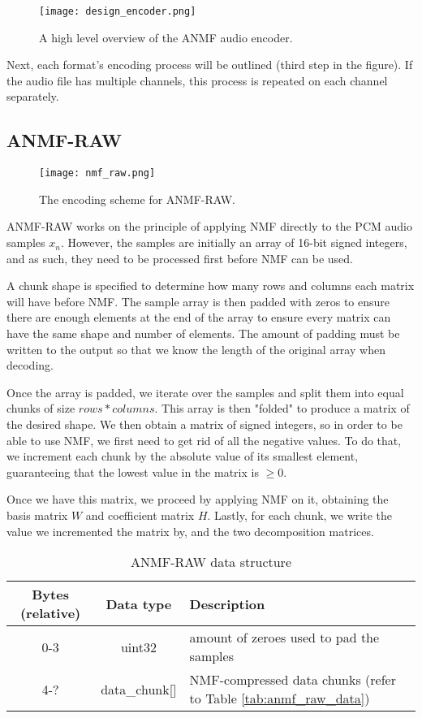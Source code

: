 \begin{figure}[ht]
	\caption[Encoder overview]{A high level overview of the ANMF audio encoder.}
	\label{fig:design_encoder}
	\centering
	\texttt{[image: design\_encoder.png]}
\end{figure}

Next, each format's encoding process will be outlined (third step in the figure). If the audio file has multiple channels, this process is repeated on each channel separately.

\subsection{ANMF-RAW}
\begin{figure}[ht]
	\caption[ANMF-RAW Encoder]{The encoding scheme for ANMF-RAW.}
	\label{fig:encoding_nmf_raw}
	\centering
	\texttt{[image: nmf\_raw.png]}
\end{figure}

ANMF-RAW works on the principle of applying NMF directly to the PCM audio samples $x_n$. However, the samples are initially an array of 16-bit signed integers, and as such, they need to be processed first before NMF can be used.

A chunk shape is specified to determine how many rows and columns each matrix will have before NMF. The sample array is then padded with zeros to ensure there are enough elements at the end of the array to ensure every matrix can have the same shape and number of elements. The amount of padding must be written to the output so that we know the length of the original array when decoding.

Once the array is padded, we iterate over the samples and split them into equal chunks of size $rows*columns$. This array is then "folded" to produce a matrix of the desired shape. We then obtain a matrix of signed integers, so in order to be able to use NMF, we first need to get rid of all the negative values. To do that, we increment each chunk by the absolute value of its smallest element, guaranteeing that the lowest value in the matrix is $\ge 0$.

Once we have this matrix, we proceed by applying NMF on it, obtaining the basis matrix $W$ and coefficient matrix $H$. Lastly, for each chunk, we write the value we incremented the matrix by, and the two decomposition matrices.

\begin{table}[htbp]\caption{ANMF-RAW data structure}
	\label{tab:anmf_raw_file}
	\centering
	\begin{tabular}{|c|c|l|}
		\hline
		Bytes (relative) & Data type & Description \\ \hline
		0-3 & uint32 & amount of zeroes used to pad the samples \\
		4-? & data\_chunk[] & NMF-compressed data chunks (refer to Table \ref{tab:anmf_raw_data}) \\
		\hline
	\end{tabular}
\end{table}

